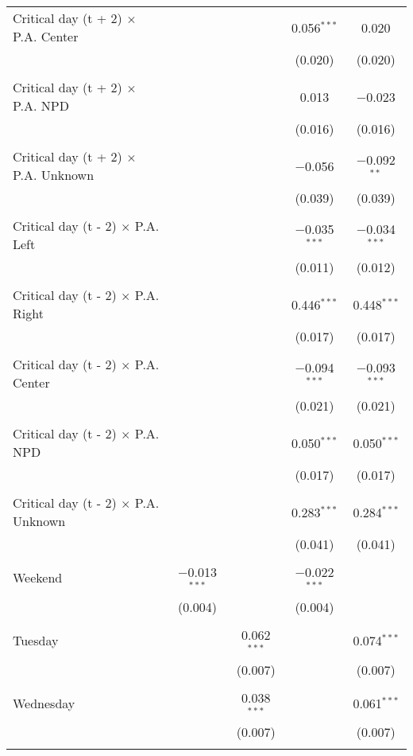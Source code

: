 \documentclass[
]{article}
\begin{document}
\begin{table}[!htbp]
{\begin{tabular}{@{\extracolsep{5pt}}lcccc}
 Critical day (t + 2) $\times$ P.A. Center &  &  & 0.056$^{***}$ & 0.020 \\ 
  &  &  & (0.020) & (0.020) \\ 
  & & & & \\ 
 Critical day (t + 2) $\times$ P.A. NPD &  &  & 0.013 & $-$0.023 \\ 
  &  &  & (0.016) & (0.016) \\ 
  & & & & \\ 
 Critical day (t + 2) $\times$ P.A. Unknown &  &  & $-$0.056 & $-$0.092$^{**}$ \\ 
  &  &  & (0.039) & (0.039) \\ 
  & & & & \\ 
 Critical day (t - 2) $\times$ P.A. Left &  &  & $-$0.035$^{***}$ & $-$0.034$^{***}$ \\ 
  &  &  & (0.011) & (0.012) \\ 
  & & & & \\ 
 Critical day (t - 2) $\times$ P.A. Right &  &  & 0.446$^{***}$ & 0.448$^{***}$ \\ 
  &  &  & (0.017) & (0.017) \\ 
  & & & & \\ 
 Critical day (t - 2) $\times$ P.A. Center &  &  & $-$0.094$^{***}$ & $-$0.093$^{***}$ \\ 
  &  &  & (0.021) & (0.021) \\ 
  & & & & \\ 
 Critical day (t - 2) $\times$ P.A. NPD &  &  & 0.050$^{***}$ & 0.050$^{***}$ \\ 
  &  &  & (0.017) & (0.017) \\ 
  & & & & \\ 
 Critical day (t - 2) $\times$ P.A. Unknown &  &  & 0.283$^{***}$ & 0.284$^{***}$ \\ 
  &  &  & (0.041) & (0.041) \\ 
  & & & & \\ 
 Weekend & $-$0.013$^{***}$ &  & $-$0.022$^{***}$ &  \\ 
  & (0.004) &  & (0.004) &  \\ 
  & & & & \\ 
 Tuesday &  & 0.062$^{***}$ &  & 0.074$^{***}$ \\ 
  &  & (0.007) &  & (0.007) \\ 
  & & & & \\ 
 Wednesday &  & 0.038$^{***}$ &  & 0.061$^{***}$ \\ 
  &  & (0.007) &  & (0.007) \\ 
  & & & & \\ 

\end{tabular}}
\end{table}
\end{document}
